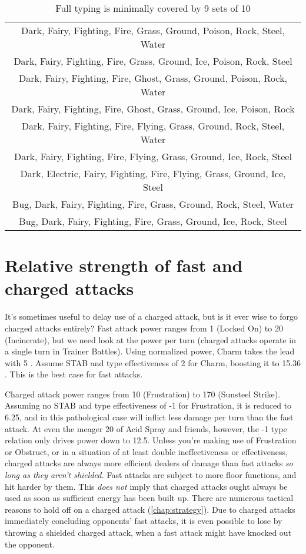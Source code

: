 \begin{table}
  \centering
  \begin{tabular}{c}
 Dark, Fairy, Fighting, Fire, Grass, Ground, Poison, Rock, Steel, Water\\
 Dark, Fairy, Fighting, Fire, Grass, Ground, Ice, Poison, Rock, Steel\\
 Dark, Fairy, Fighting, Fire, Ghost, Grass, Ground, Poison, Rock, Water\\
 Dark, Fairy, Fighting, Fire, Ghost, Grass, Ground, Ice, Poison, Rock\\
 Dark, Fairy, Fighting, Fire, Flying, Grass, Ground, Rock, Steel, Water\\
 Dark, Fairy, Fighting, Fire, Flying, Grass, Ground, Ice, Rock, Steel\\
 Dark, Electric, Fairy, Fighting, Fire, Flying, Grass, Ground, Ice, Steel\\
 Bug, Dark, Fairy, Fighting, Fire, Grass, Ground, Rock, Steel, Water\\
 Bug, Dark, Fairy, Fighting, Fire, Grass, Ground, Ice, Rock, Steel\\
  \end{tabular}
  \caption{Full typing is minimally covered by 9 sets of 10\label{table:coversetsdual}}
\end{table}

\section{Relative strength of fast and charged attacks\label{sec:fastvcharged}}
It's sometimes useful to delay use of a charged attack, but is it ever wise to forgo
  charged attacks entirely?
Fast attack power ranges from 1 (Locked On) to 20 (Incinerate), but we need look at
  the power per turn (charged attacks operate in a single turn in Trainer Battles).
Using normalized power, Charm takes the lead with 5 \PPT{}\@.
Assume STAB and type effectiveness of 2 for Charm, boosting it to 15.36 \PPT{}\@.
This is the best case for fast attacks.

Charged attack power ranges from 10 (Frustration) to 170 (Sunsteel Strike).
Assuming no STAB and type effectiveness of -1 for Frustration, it is reduced to 6.25,
  and in this pathological case will inflict less damage per turn than the fast attack.
At even the meager 20 of Acid Spray and friends, however, the -1 type relation only
  drives power down to 12.5.
Unless you're making use of Frustration or Obstruct,
  or in a situation of at least double ineffectiveness or effectiveness,
  charged attacks are always more efficient dealers of damage than fast attacks \textit{so long
  as they aren't shielded.}
Fast attacks are subject to more floor functions, and hit harder by them.
This \textit{does not} imply that charged attacks ought always be used as soon as
  sufficient energy has been built up.
There are numerous tactical reasons to hold off on a charged attack (\autoref{chap:strategy}).
Due to charged attacks immediately concluding opponents' fast attacks,
 it is even possible to lose by throwing a shielded charged attack, when
 a fast attack might have knocked out the opponent.

